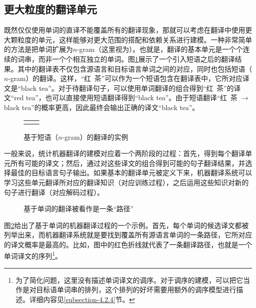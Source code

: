 
\subsection{更大粒度的翻译单元}

\parinterval 既然仅仅使用单词的直译不能覆盖所有的翻译现象，那就可以考虑在翻译中使用更大颗粒度的单元，这样能够对更大范围的搭配和依赖关系进行建模。一种非常简单的方法是把单词扩展为$n$-gram（这里视为{\small{}}）。也就是，翻译的基本单元是一个个连续的词串，而非一个个相互独立的单词。图\ref{fig:4-3}展示了一个引入短语之后的翻译结果。其中的翻译表不仅包含源语言和目标语言单词之间的对应，同时也包括短语（$n$-gram）的翻译。这样，``红\ 茶''可以作为一个短语包含在翻译表中，它所对应译文是``black tea''。对于待翻译句子，可以使用单词翻译的组合得到``红\ 茶''的译文``red tea''，也可以直接使用短语翻译得到``black tea''。由于短语翻译``红\ 茶 $\to$ black tea''的概率更高，因此最终会输出正确的译文``black tea''。

\begin{figure}[htp]
\centering
\begin{tabular}{l r}
\subfigure{} & \subfigure{} \\
\end{tabular}
\caption{基于短语（$n$-gram）的翻译的实例}
\label{fig:4-3}
\end{figure}

\parinterval 一般来说，统计机器翻译的建模对应着一个两阶段的过程：首先，得到每个翻译单元所有可能的译文；然后，通过对这些译文的组合得到可能的句子翻译结果，并选择最佳的目标语言句子输出。如果基本的翻译单元被定义下来，机器翻译系统可以学习这些单元翻译所对应的翻译知识（对应训练过程），之后运用这些知识对新的句子进行翻译（对应解码过程）。

\begin{figure}[htp]
\centering

\caption{基于单词的翻译被看作是一条``路径''}
\label{fig:4-4}
\end{figure}

\parinterval 图\ref{fig:4-4}给出了基于单词的机器翻译过程的一个示例。首先，每个单词的候选译文都被列举出来，而机器翻译系统就是要找到覆盖所有源语言单词的一条路径，它所对应的译文概率是最高的。比如，图中的红色折线就代表了一条翻译路径，也就是一个单词译文的序列\footnote[1]{为了简化问题，这里没有描述单词译文的调序。对于调序的建模，可以把它当作是对目标语单词串的排列，这个排列的好坏需要用额外的调序模型进行描述。详细内容见\ref{subsection-4.2.4}节。}。

